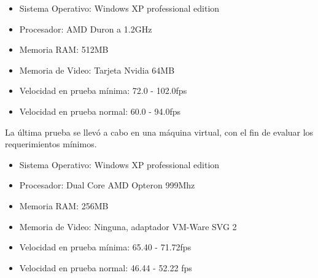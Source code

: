 \begin{itemize}
 \item Sistema Operativo: Windows XP professional edition
 \item Procesador: AMD Duron a 1.2GHz
 \item Memoria RAM: 512MB
 \item Memoria de Video: Tarjeta Nvidia 64MB
 \item Velocidad en prueba mínima: 72.0 - 102.0fps
 \item Velocidad en prueba normal: 60.0 - 94.0fps
\end{itemize}

La última prueba se llevó a cabo en una máquina virtual, con el fin de evaluar los requerimientos mínimos.

\begin{itemize}
 \item Sistema Operativo: Windows XP professional edition
 \item Procesador: Dual Core AMD Opteron 999Mhz
 \item Memoria RAM: 256MB
 \item Memoria de Video: Ninguna, adaptador VM-Ware SVG 2
 \item Velocidad en prueba mínima: 65.40 - 71.72fps
 \item Velocidad en prueba normal: 46.44 - 52.22 fps
\end{itemize}

